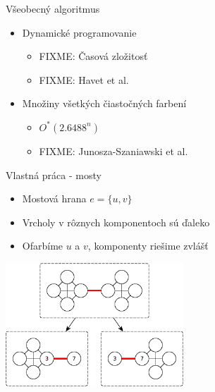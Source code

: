 \documentclass[slovak]{beamer}
\begin{document}
\begin{frame}{Všeobecný algoritmus}
    \begin{itemize}
        \item Dynamické programovanie
        \begin{itemize}
            \item FIXME: Časová zložitosť
            \item FIXME: Havet et al.
        \end{itemize}
        \item Množiny všetkých čiastočných farbení
        \begin{itemize}
            \item $O^*(2.6488^n)$
            \item FIXME: Junosza-Szaniawski et al.
        \end{itemize}
    \end{itemize}
\end{frame}

\begin{frame}{Vlastná práca - mosty}
    \begin{itemize}
        \item Mostová hrana $e = \{u,v\}$
        \item Vrcholy v rôznych komponentoch sú ďaleko
        \item Ofarbíme $u$ a $v$, komponenty riešime zvlášť
    \end{itemize}
    \begin{center}
        \includegraphics[width=0.5\textwidth]{grafy/bridgesplit.pdf}
    \end{center}
\end{frame}
\end{document}
